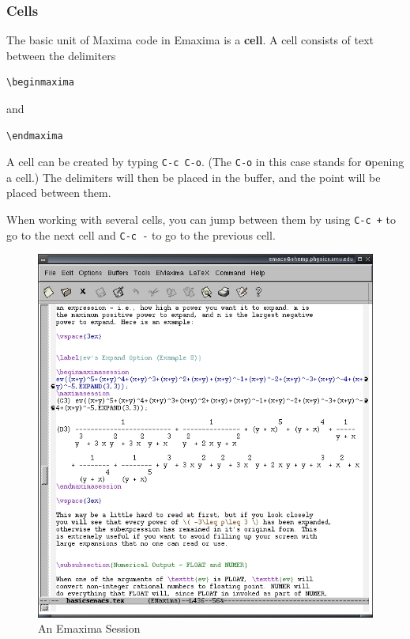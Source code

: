 \subsubsection{Cells}

The basic unit of Maxima code in Emaxima is a \textbf{cell}.  A cell
consists of text between the delimiters
\begin{verbatim}
\beginmaxima
\end{verbatim}
\noindent
and
\begin{verbatim}
\endmaxima
\end{verbatim}
\noindent
A cell can be created by typing \texttt{C-c C-o}.  (The \texttt{C-o} in this
case stands for \textbf{o}pening a cell.)  The delimiters will then be
placed in the buffer, and the point will be placed between them.

When working with several cells, you can jump between them by using
\texttt{C-c +} to go to the next cell and \texttt{C-c -} to go to the
previous cell.

\begin{figure}

\centering \includegraphics{images/emaximashot} \par
\caption{An Emaxima Session}

\end{figure}

